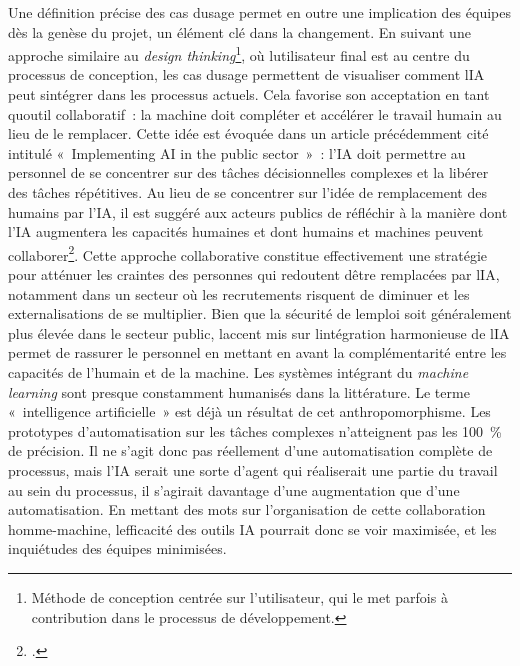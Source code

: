 Une définition précise des cas d\textquotesingle usage permet en outre
une implication des équipes dès la genèse du projet, un élément clé dans
la \gls{changement}. En suivant une approche
similaire au \emph{design thinking}\footnote{Méthode de conception
	centrée sur l'utilisateur, qui le met parfois à contribution dans le
	processus de développement.}, où l\textquotesingle utilisateur final
est au centre du processus de conception, les cas
d\textquotesingle usage permettent de visualiser comment
l\textquotesingle IA peut s\textquotesingle intégrer dans les processus
actuels. Cela favorise son acceptation en tant qu\textquotesingle outil collaboratif~: la
machine doit compléter et accélérer le travail humain au lieu de le
remplacer. Cette idée est évoquée dans un article précédemment cité
intitulé «~Implementing AI in the public sector~»~: l'IA doit permettre
au personnel de se concentrer sur des tâches décisionnelles complexes et
la libérer des tâches répétitives. Au lieu de se concentrer sur l'idée
de remplacement des humains par l'IA, il est suggéré aux
acteurs publics de réfléchir à la manière dont l'IA augmentera les
capacités humaines et dont humains et machines peuvent
collaborer\footcite{mergel_implementing_2023}. Cette approche
collaborative constitue effectivement une stratégie pour atténuer les
craintes des personnes qui redoutent d\textquotesingle être remplacées
par l\textquotesingle IA, notamment dans un secteur où les recrutements
risquent de diminuer et les externalisations de se multiplier. Bien que
la sécurité de l\textquotesingle emploi soit généralement plus élevée
dans le secteur public, l\textquotesingle accent mis sur
l\textquotesingle intégration harmonieuse de l\textquotesingle IA permet
de rassurer le personnel en mettant en avant la complémentarité entre
les capacités de l'humain et de la machine. Les systèmes intégrant du
\emph{machine learning} sont presque constamment humanisés dans la
littérature. Le terme «~intelligence artificielle~» est déjà un résultat
de cet anthropomorphisme. Les prototypes d'automatisation sur les tâches complexes
n'atteignent pas les 100~\% de précision.
Il ne s'agit donc pas réellement d'une automatisation complète de
processus, mais l'IA serait une sorte d'agent qui réaliserait une partie
du travail au sein du processus, il s'agirait davantage d'une augmentation que d'une automatisation. En mettant des mots sur l'organisation de
cette collaboration homme-machine, l\textquotesingle efficacité des
outils IA pourrait donc se voir maximisée, et les inquiétudes des
équipes minimisées.\newline

